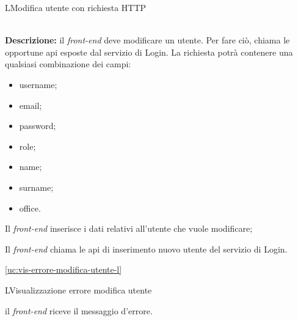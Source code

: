 \begin{usecase}{5}{L}{Modifica utente con richiesta HTTP}


	\textbf{\\Descrizione:} il \textit{front-end} deve modificare un utente. Per fare ciò,
	chiama le opportune \acrshort{api} esposte dal servizio di Login. La richiesta potrà contenere una qualsiasi combinazione dei campi:
	\begin{itemize}[noitemsep]
		\item username;
		\item email;
		\item password;
		\item role;
		\item name;
		\item surname;
		\item office.
	\end{itemize}

	\begin{ucscenarioprincipale}
		\item Il \textit{front-end} inserisce i dati relativi all'utente che vuole modificare;
		\item Il \textit{front-end} chiama le \acrshort{api} di inserimento nuovo utente del servizio di Login.
	\end{ucscenarioprincipale}


	\begin{ucestensioni}
		\item \ref{uc:vis-errore-modifica-utente-l}
	\end{ucestensioni}

	\label{uc:richiesta-modifica-utente-l}
\end{usecase}

\begin{usecase}{6}{L}{Visualizzazione errore modifica utente}



	\begin{ucscenarioprincipale}
		\item il \textit{front-end} riceve il messaggio d'errore.
	\end{ucscenarioprincipale}


	\label{uc:vis-errore-modifica-utente-l}
\end{usecase}


